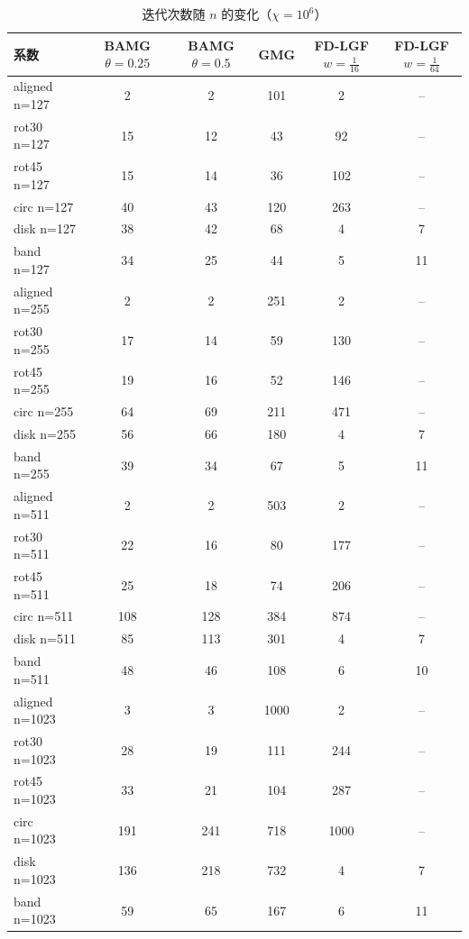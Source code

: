 \begin{table}[H]\centering\small
\caption{迭代次数随 $n$ 的变化（$\chi=10^{6}$）}\label{tab:n6}
\begin{tabular}{lccccc}
\toprule
系数 & BAMG $\theta{=}0.25$ & BAMG $\theta{=}0.5$ & GMG & FD-LGF $w{=}\frac1{16}$ & FD-LGF $w{=}\frac1{64}$ \\
\midrule
aligned n=127 & 2 & 2 & 101 & 2 & -- \\
rot30 n=127 & 15 & 12 & 43 & 92 & -- \\
rot45 n=127 & 15 & 14 & 36 & 102 & -- \\
circ n=127 & 40 & 43 & 120 & 263 & -- \\
disk n=127 & 38 & 42 & 68 & 4 & 7 \\
band n=127 & 34 & 25 & 44 & 5 & 11 \\
aligned n=255 & 2 & 2 & 251 & 2 & -- \\
rot30 n=255 & 17 & 14 & 59 & 130 & -- \\
rot45 n=255 & 19 & 16 & 52 & 146 & -- \\
circ n=255 & 64 & 69 & 211 & 471 & -- \\
disk n=255 & 56 & 66 & 180 & 4 & 7 \\
band n=255 & 39 & 34 & 67 & 5 & 11 \\
aligned n=511 & 2 & 2 & 503 & 2 & -- \\
rot30 n=511 & 22 & 16 & 80 & 177 & -- \\
rot45 n=511 & 25 & 18 & 74 & 206 & -- \\
circ n=511 & 108 & 128 & 384 & 874 & -- \\
disk n=511 & 85 & 113 & 301 & 4 & 7 \\
band n=511 & 48 & 46 & 108 & 6 & 10 \\
aligned n=1023 & 3 & 3 & 1000 & 2 & -- \\
rot30 n=1023 & 28 & 19 & 111 & 244 & -- \\
rot45 n=1023 & 33 & 21 & 104 & 287 & -- \\
circ n=1023 & 191 & 241 & 718 & 1000 & -- \\
disk n=1023 & 136 & 218 & 732 & 4 & 7 \\
band n=1023 & 59 & 65 & 167 & 6 & 11 \\
\bottomrule
\end{tabular}
\end{table}
